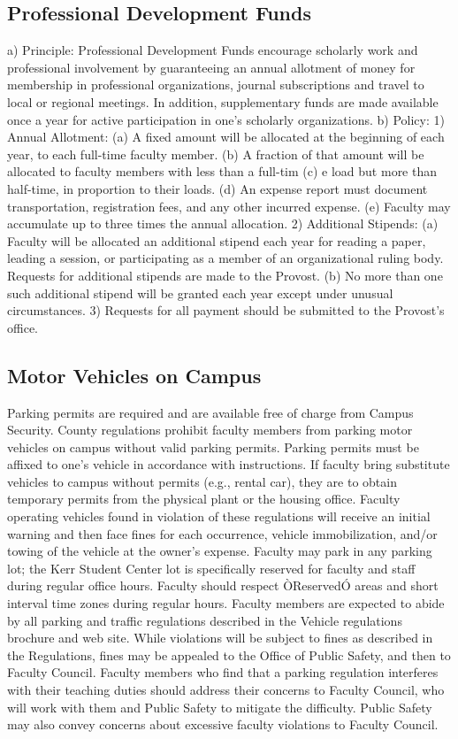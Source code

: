 \documentclass[letterpaper, 11pt]{article}
\begin{document}
	\subsection{Professional Development Funds}
		a) Principle:  Professional Development Funds encourage scholarly work and professional involvement by guaranteeing an annual allotment of money for membership in professional organizations, journal subscriptions and travel to local or regional meetings.  In addition, supplementary funds are made available once a year for active participation in one's scholarly organizations.
		b) Policy:
		1) Annual Allotment:
		(a) A fixed amount will be allocated at the beginning of each year, to each full-time faculty member.
		(b) A fraction of that amount will be allocated to faculty members with less than a full-tim
		(c) e load but more than half-time, in proportion to their loads.
		(d) An expense report must document transportation, registration fees, and any other incurred expense.
		(e) Faculty may accumulate up to three times the annual allocation.
		2) Additional Stipends:
		(a) Faculty will be allocated an additional stipend each year for reading a paper, leading a session, or participating as a member of an organizational ruling body.  Requests for additional stipends are made to the Provost.
		(b) No more than one such additional stipend will be granted each year except under unusual circumstances.
		3) Requests for all payment should be submitted to the Provost's office.
	\subsection{Motor Vehicles on Campus}
		Parking permits are required and are available free of charge from Campus Security.  County regulations prohibit faculty members from parking motor vehicles on campus without valid parking permits.  Parking permits must be affixed to one's vehicle in accordance with instructions.  If faculty bring substitute vehicles to campus without permits (e.g., rental car), they are to obtain temporary permits from the physical plant or the housing office.  Faculty operating vehicles found in violation of these regulations will receive an initial warning and then face fines for each occurrence, vehicle immobilization, and/or towing of the vehicle at the owner's expense.  Faculty may park in any parking lot; the Kerr Student Center lot is specifically reserved for faculty and staff during regular office hours.  Faculty should respect ÒReservedÓ areas and short interval time zones during regular hours.
		Faculty members are expected to abide by all parking and traffic regulations described in the Vehicle regulations brochure and web site.  While violations will be subject to fines as described in the Regulations, fines may be appealed to the Office of Public Safety, and then to Faculty Council.  Faculty members who find that a parking regulation interferes with their teaching duties should address their concerns to Faculty Council, who will work with them and Public Safety to mitigate the difficulty.  Public Safety may also convey concerns about excessive faculty violations to Faculty Council.
\end{document}
